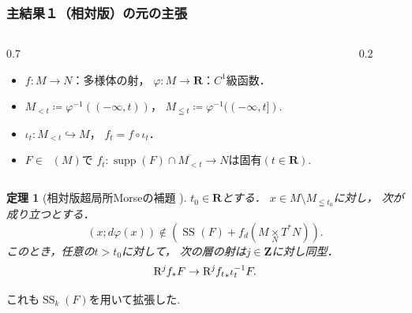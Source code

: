 \documentclass[dvipdfmx,10pt,aspectratio=169,leqno]{beamer}%
\newcommand{\zz}{\mathbf{Z}}
\newcommand{\rr}{\mathbf{R}}
\numberwithin{equation}{subsection}
\newcommand{\supp}{\mathop{\mathrm{supp}}\nolimits}
\newcommand{\Dompb}{\mathop{\mathsf{D}^\mathrm{b}}\nolimits}
\newcommand{\muS}[1][]{\mathop{\mathrm{SS}}\nolimits_{#1}}
\newcommand{\Rder}[1][]{\mathop{\mathrm{R}^{#1}\hspace{-2pt}}\nolimits}
\newcommand{\mdiff}[1][]{{#1}_{d}} %
\newcommand{\pb}[1][]{\mathbin{\mathop{\times}\limits_{#1}}}
\newcommand{\cotb}[1][]{T^{\ast}{#1}}
\theoremstyle{mystyle}
\newtheorem{THM}[AXM]{定理}
\begin{document}
\begin{frame}[fragile]
  \frametitle{主結果１（相対版）の元の主張}
  \begin{columns}
    \begin{column}{0.7\hsize}
      \begin{itemize}
        \item \(f\colon M\to N\)：多様体の射，
        \quad\(\varphi\colon M\to \rr\)：\(C^{1}\)級函数．
        \item \(M_{<t}\coloneqq \varphi^{-1}((-\infty,t))\)，\quad
        \(M_{\leqq t}\coloneqq \varphi^{-1}((-\infty,t])\).
        \item \(\iota_{t}\colon M_{<t}\hookrightarrow M\)，
        \quad\(f_{t}=f\circ \iota_{t}\)．
        \item \(F\in\Dompb(M)\)で
        \(f_{t}\colon \supp(F)\cap \overline{M_{<t}}\to N\)は固有\((t\in\rr).\)
      \end{itemize}
    \end{column}
    \begin{column}{0.2\hsize}
    \end{column}
  \end{columns}\pause
  \begin{THM}[相対版超局所Morseの補題 {\cite{KS90}}]
    \(t_{0}\in\rr\)とする．
    \(x\in M\setminus M_{\leqq t_{0}}\)に対し，
    次が成り立つとする．
    \[
      (x;d\varphi(x))\notin \left(
        \muS[](F)+ \mdiff[f]\left(
          M\pb[N]\cotb[N]
        \right)
      \right).
    \]
    このとき，任意の\(t>t_{0}\)に対して，
    次の層の射は\(j\in\zz\)に対し同型．
    \[
      \Rder[j]{f_{\ast}}F
      \to
      \Rder[j]{{f_{t}}_{\ast}}\iota^{-1}_{t}F.
    \]
  \end{THM}\pause
  これも\(\muS[k](F)\)を用いて拡張した.
\end{frame}
\end{document}
